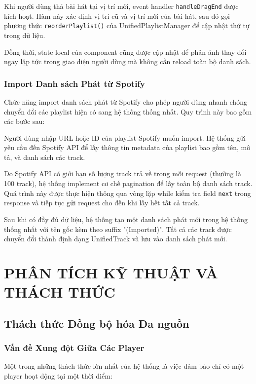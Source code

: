 \documentclass[12pt,a4paper]{article}
\begin{document}
Khi người dùng thả bài hát tại vị trí mới, event handler \texttt{handleDragEnd} được kích hoạt. Hàm này xác định vị trí cũ và vị trí mới của bài hát, sau đó gọi phương thức \texttt{reorderPlaylist()} của UnifiedPlaylistManager để cập nhật thứ tự trong dữ liệu.

Đồng thời, state local của component cũng được cập nhật để phản ánh thay đổi ngay lập tức trong giao diện người dùng mà không cần reload toàn bộ danh sách.

\subsubsection{Import Danh sách Phát từ Spotify}

Chức năng import danh sách phát từ Spotify cho phép người dùng nhanh chóng chuyển đổi các playlist hiện có sang hệ thống thống nhất. Quy trình này bao gồm các bước sau:

Người dùng nhập URL hoặc ID của playlist Spotify muốn import. Hệ thống gửi yêu cầu đến Spotify API để lấy thông tin metadata của playlist bao gồm tên, mô tả, và danh sách các track.

Do Spotify API có giới hạn số lượng track trả về trong mỗi request (thường là 100 track), hệ thống implement cơ chế pagination để lấy toàn bộ danh sách track. Quá trình này được thực hiện thông qua vòng lặp while kiểm tra field \texttt{next} trong response và tiếp tục gửi request cho đến khi lấy hết tất cả track.

Sau khi có đầy đủ dữ liệu, hệ thống tạo một danh sách phát mới trong hệ thống thống nhất với tên gốc kèm theo suffix "(Imported)". Tất cả các track được chuyển đổi thành định dạng UnifiedTrack và lưu vào danh sách phát mới.

\section{PHÂN TÍCH KỸ THUẬT VÀ THÁCH THỨC}

\subsection{Thách thức Đồng bộ hóa Đa nguồn}

\subsubsection{Vấn đề Xung đột Giữa Các Player}

Một trong những thách thức lớn nhất của hệ thống là việc đảm bảo chỉ có một player hoạt động tại một thời điểm:
\end{document}
